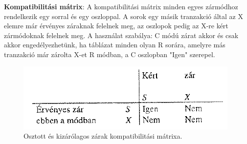 \documentclass[margin=0px]{article}
\begin{document}
\noindent \textbf{Kompatibilitási mátrix}: A kompatibilitási mátrix minden egyes zármódhoz rendelkezik egy sorral és egy oszloppal.
A sorok egy másik tranzakció által az X elemre már érvényes záraknak felelnek meg, az oszlopok pedig az X-re kért zármódoknak
felelnek meg. A használat szabálya: C módú zárat akkor és csak akkor engedélyezhetünk, ha táblázat minden olyan R sorára, amelyre
más tranzakció már zárolta X-et R módban, a C oszlopban "Igen" szerepel.

\begin{figure}[H]
    \centering
    \includegraphics[width=0.5\linewidth]{img/kompmatrix}
    \caption{Osztott és kizárólagos zárak kompatibilitási mátrixa.}
    \label{fig:kompmatrix}
\end{figure}
\end{document}
